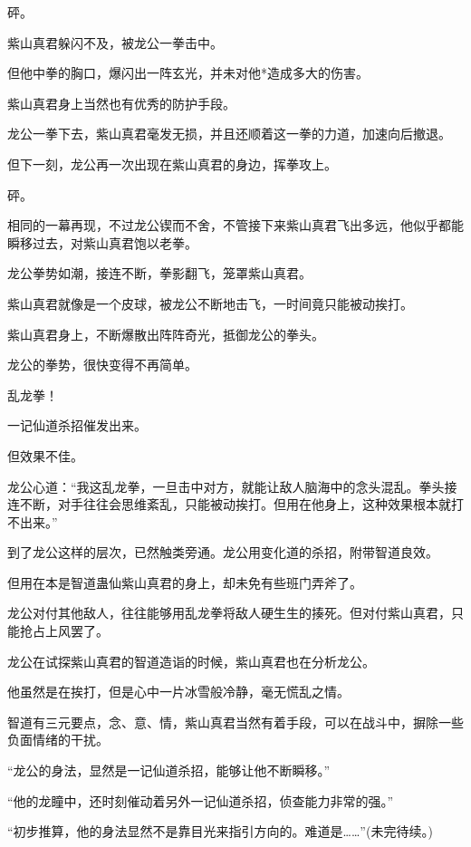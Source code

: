 \begin{this_body}
砰。

紫山真君躲闪不及，被龙公一拳击中。

但他中拳的胸口，爆闪出一阵玄光，并未对他*造成多大的伤害。

紫山真君身上当然也有优秀的防护手段。

龙公一拳下去，紫山真君毫发无损，并且还顺着这一拳的力道，加速向后撤退。

但下一刻，龙公再一次出现在紫山真君的身边，挥拳攻上。

砰。

相同的一幕再现，不过龙公锲而不舍，不管接下来紫山真君飞出多远，他似乎都能瞬移过去，对紫山真君饱以老拳。

龙公拳势如潮，接连不断，拳影翻飞，笼罩紫山真君。

紫山真君就像是一个皮球，被龙公不断地击飞，一时间竟只能被动挨打。

紫山真君身上，不断爆散出阵阵奇光，抵御龙公的拳头。

龙公的拳势，很快变得不再简单。

乱龙拳！

一记仙道杀招催发出来。

但效果不佳。

龙公心道：“我这乱龙拳，一旦击中对方，就能让敌人脑海中的念头混乱。拳头接连不断，对手往往会思维紊乱，只能被动挨打。但用在他身上，这种效果根本就打不出来。”

到了龙公这样的层次，已然触类旁通。龙公用变化道的杀招，附带智道良效。

但用在本是智道蛊仙紫山真君的身上，却未免有些班门弄斧了。

龙公对付其他敌人，往往能够用乱龙拳将敌人硬生生的揍死。但对付紫山真君，只能抢占上风罢了。

龙公在试探紫山真君的智道造诣的时候，紫山真君也在分析龙公。

他虽然是在挨打，但是心中一片冰雪般冷静，毫无慌乱之情。

智道有三元要点，念、意、情，紫山真君当然有着手段，可以在战斗中，摒除一些负面情绪的干扰。

“龙公的身法，显然是一记仙道杀招，能够让他不断瞬移。”

“他的龙瞳中，还时刻催动着另外一记仙道杀招，侦查能力非常的强。”

“初步推算，他的身法显然不是靠目光来指引方向的。难道是……”(未完待续。)

\end{this_body}

